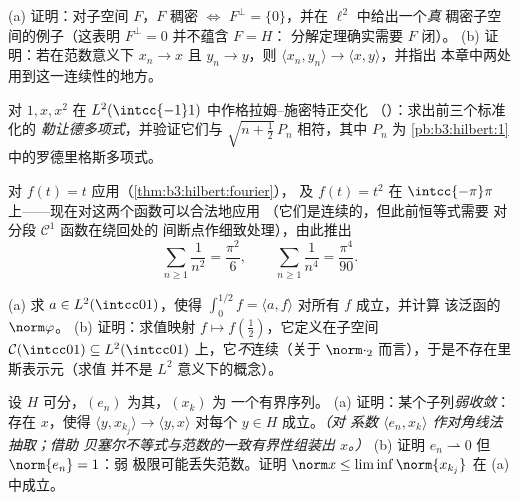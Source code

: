 \begin{exercise}[$\star\star$]\label{exo:b3:hilbert:3}
(a) 证明：对子空间 $F$，$F$ 稠密 $\iff$ $F^\perp =
\{0\}$，并在 $\ell^2$ 中给出一个\emph{真}
稠密子空间的例子（这表明 $F^\perp = 0$ 并不蕴含 $F = H$：
分解定理确实需要 $F$ 闭）。
(b) 证明：若在范数意义下 $x_n \to x$ 且 $y_n \to y$，则
$\langle x_n, y_n\rangle \to \langle x, y\rangle$，并指出
本章中两处用到这一连续性的地方。
\end{exercise}

\begin{exercise}[$\star\star$]\label{exo:b3:hilbert:4}
对 $1, x, x^2$ 在 $L^2(\intcc{-1}1)$ 中作格拉姆–施密特正交化
（）：求出前三个标准化的
\emph{勒让德多项式}，并验证它们与
$\sqrt{n + \frac12}\,P_n$ 相符，其中 $P_n$ 为
\cref{pb:b3:hilbert:1} 中的罗德里格斯多项式。
\end{exercise}

\begin{exercise}[$\star\star$]\label{exo:b3:hilbert:5}
对 $f(t) = t$ 应用（\cref{thm:b3:hilbert:fourier}），
及 $f(t) = t^2$ 在 $\intcc{-\pi}\pi$ 上——现在对这两个函数可以合法地应用
（它们是连续的，但此前恒等式需要
对分段 $\mathcal C^1$ 函数在绕回处的
间断点作细致处理），由此推出
\[
\sum_{n\geq1}\frac1{n^2} = \frac{\pi^2}6,
\qquad
\sum_{n\geq1}\frac1{n^4} = \frac{\pi^4}{90} .
\]
\end{exercise}

\begin{exercise}[$\star\star$]\label{exo:b3:hilbert:6}
(a) 求 $a \in L^2(\intcc01)$，使得 $\int_0^{1/2}f =
\langle a, f\rangle$ 对所有 $f$ 成立，并计算
该泛函的 $\norm\varphi$。
(b) 证明：求值映射 $f \mapsto f(\frac12)$，它定义在子空间
$\mathcal C(\intcc01) \subseteq
L^2(\intcc01)$ 上，它\emph{不}连续（关于
$\norm\cdot_2$ 而言），于是不存在里斯表示元（求值
并不是 $L^2$ 意义下的概念）。
\end{exercise}

\begin{exercise}[$\star\star\star$]\label{exo:b3:hilbert:7}
设 $H$ 可分，$(e_n)$ 为其，$(x_k)$ 为
一个有界序列。
(a) 证明：某个子列\emph{弱收敛}：存在
$x$，使得 $\langle y, x_{k_j}\rangle \to \langle y,
x\rangle$ 对每个 $y \in H$ 成立。\emph{（对
系数 $\langle e_n, x_k\rangle$ 作对角线法抽取；借助
贝塞尔不等式与范数的一致有界性组装出 $x$。）}
(b) 证明 $e_n \rightharpoonup 0$ 但 $\norm{e_n} = 1$：弱
极限可能丢失范数。证明 $\norm x \leq
\liminf\norm{x_{k_j}}$ 在 (a) 中成立。
\end{exercise}

